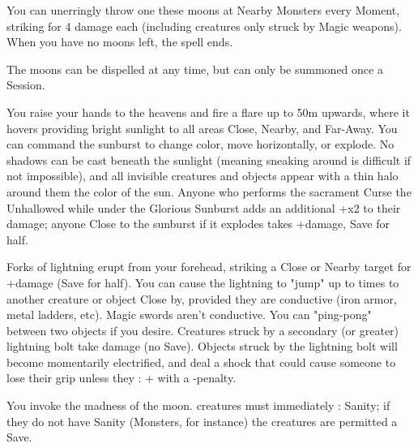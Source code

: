 You can unerringly throw one these moons at Nearby Monsters every Moment, striking for 4 damage each (including creatures only struck by Magic weapons).  When you have no moons left, the spell ends.

The moons can be dispelled at any time, but can only be summoned once a Session.

\MYSTERY [
  Name = Glorious Sunburst,
  Link = arcana-mystery-glorious-sunburst,
  Paradigm = Elements,
  Save = Y (half),
  Duration = Combat or \SUM Minutes,
  Target = See Below
]

You raise your hands to the heavens and fire a flare up to 50m upwards, where it hovers providing bright sunlight to all areas Close, Nearby, and Far-Away.  You can command the sunburst to change color, move horizontally, or explode.  No shadows can be cast beneath the sunlight (meaning sneaking around is difficult if not impossible), and all invisible creatures and objects appear with a thin halo around them the color of the sun.  Anyone who performs the sacrament Curse the Unhallowed while under the Glorious Sunburst adds an additional +\DICE x2 to their damage; anyone Close to the sunburst if it explodes takes \SUMDICE+\DICE damage, Save for half.

\MYSTERY [
  Name = Lightning,
  Link = arcana-mystery-lightning,
  Paradigm = Elements,
  Save = Y (half),
  Duration = Instant,
  Target = Close or Nearby Target(s)
]

Forks of lightning erupt from your forehead, striking a Close or Nearby target for \SUMDICE+\DICE damage (Save for half). You can cause the lightning to "jump" up to  times to another creature or object Close by, provided they are conductive (iron armor, metal ladders, etc).  Magic swords aren't conductive.  You can "ping-pong" between two objects if you desire. Creatures struck by a secondary (or greater) lightning bolt take \DICE damage (no Save). Objects struck by the lightning bolt will become momentarily electrified, and deal a shock that could cause someone to lose their grip unless they \RO : \VIG + \FOC with a -\DICE penalty.

\MYSTERY [
  Name = Lunacy,
  Link = arcana-mystery-lunacy,
  Paradigm = Mind,
  Save = Y (neg.),
  Duration = Markovian,
  Target = Close or Nearby Target(s)
]

You invoke the madness of the moon.  \DICE creatures must immediately \RS : Sanity; if they do not have Sanity (Monsters, for instance) the creatures are permitted a Save.

